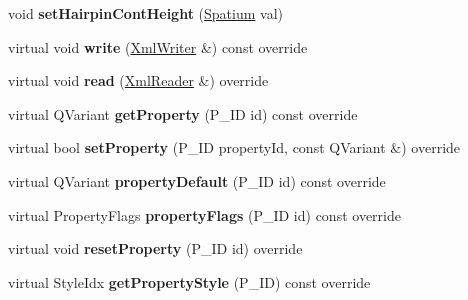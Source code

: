\begin{DoxyCompactItemize}
\item 
\mbox{\label{class_ms_1_1_hairpin_a561a76befe0df07e4d76cfa2a027ff0c}} 
void {\bfseries set\+Hairpin\+Cont\+Height} (\hyperlink{class_ms_1_1_spatium}{Spatium} val)
\item 
\mbox{\label{class_ms_1_1_hairpin_a65588b56406913c799c1d47290393305}} 
virtual void {\bfseries write} (\hyperlink{class_ms_1_1_xml_writer}{Xml\+Writer} \&) const override
\item 
\mbox{\label{class_ms_1_1_hairpin_aa4c4c1bd564a0175192eaa4eac30c303}} 
virtual void {\bfseries read} (\hyperlink{class_ms_1_1_xml_reader}{Xml\+Reader} \&) override
\item 
\mbox{\label{class_ms_1_1_hairpin_a65079b852cadc8d03d46dcc5bb88bf24}} 
virtual Q\+Variant {\bfseries get\+Property} (P\+\_\+\+ID id) const override
\item 
\mbox{\label{class_ms_1_1_hairpin_a899b3811efaeeb75cd399dc4f223afd6}} 
virtual bool {\bfseries set\+Property} (P\+\_\+\+ID property\+Id, const Q\+Variant \&) override
\item 
\mbox{\label{class_ms_1_1_hairpin_a29315c50a2ebba14d85fb180e65008ae}} 
virtual Q\+Variant {\bfseries property\+Default} (P\+\_\+\+ID id) const override
\item 
\mbox{\label{class_ms_1_1_hairpin_a38402e2ba8bb332caf098a9819656d13}} 
virtual Property\+Flags {\bfseries property\+Flags} (P\+\_\+\+ID id) const override
\item 
\mbox{\label{class_ms_1_1_hairpin_a348133c258df0d18643e3efd510af3b4}} 
virtual void {\bfseries reset\+Property} (P\+\_\+\+ID id) override
\item 
\mbox{\label{class_ms_1_1_hairpin_aa6590a8fa649ff9262e11fac30099694}} 
virtual Style\+Idx {\bfseries get\+Property\+Style} (P\+\_\+\+ID) const override
\item 
\mbox{\label{class_ms_1_1_hairpin_aeaa49b62aa64e1b8fdc9115129c3067b}} 

\end{DoxyCompactItemize}

